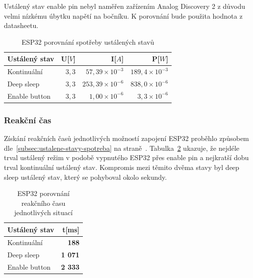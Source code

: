 \documentclass[a4paper, 12pt]{report}
\begin{document}
    Ustálený stav enable pin nebyl naměřen zařízením Analog Discovery 2 z důvodu velmi nízkému úbytku napětí na bočníku.
    K porovnání bude použita hodnota z datasheetu.
    \begin{table}[h!]
        \centering
        \caption{ESP32 porovnání spotřeby ustálených stavů}
        \begin{tabular}{||l|r r r||}
            \hline
            Ustálený stav & U[$V$] & I[$A$]                  & P[$W$]                 \\
            \hline
            Kontinuální   & $3,3$  & $57,39 \times 10^{-3}$  & $189,4 \times 10^{-3}$ \\
            Deep sleep    & $3,3$  & $253,39 \times 10^{-6}$ & $838,0 \times 10^{-6}$ \\
            Enable button & $3,3$  & $1,00\times 10^{-6}$    & $3,3\times 10^{-6}$    \\
            \hline
        \end{tabular}
        \label{tab:esp32-klidove-rezimy-spotreba}
    \end{table}

    \subsubsection{Reakční čas}
    Získání reakčních časů jednotlivých možností zapojení ESP32 proběhlo způsobem dle~\ref{subsec:ustalene-stavy-spotreba} na straně~\pageref{subsec:ustalene-stavy-spotreba}.
    Tabulka~\ref{tab:esp32-klidove-rezimy-cas} ukazuje, že nejdéle trval ustálený režim v podobě vypnutého ESP32 přes enable pin a nejkratší dobu trval kontinuální ustálený stav.
    Kompromis mezi těmito dvěma stavy byl deep sleep ustálený stav, který se pohyboval okolo sekundy.

    \begin{table}[h]
        \centering
        \caption{ESP32 porovnání reakčního času jednotlivých situací}
        \begin{tabular}{||l|r||}
            \hline
            Ustálený stav & t[ms]           \\
            \hline
            Kontinuální   & \textbf{188}    \\
            Deep sleep    & \textbf{1 071} \\
            Enable button & \textbf{2 333} \\
            \hline
        \end{tabular}
        \label{tab:esp32-klidove-rezimy-cas}
    \end{table}
\end{document}
